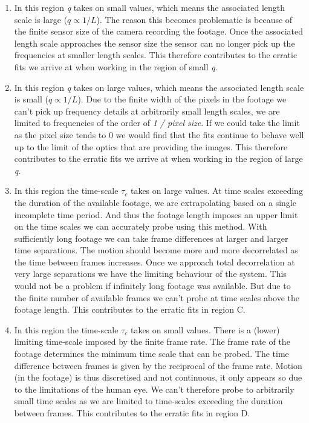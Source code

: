 \documentclass[10pt]{article}
\begin{document}
\begin{enumerate}[label=(\Alph*)]
\item In this region \textit{q} takes on small values, which means the associated length scale is large ($q \propto 1 / L$). The reason this becomes problematic is because of the finite sensor size of the camera recording the footage. Once the associated length scale approaches the sensor size the sensor can no longer pick up the frequencies at smaller length scales. This therefore contributes to the erratic fits we arrive at when working in the region of small \textit{q}.
     
\item In this region \textit{q} takes on large values, which means the associated length scale is small ($q \propto 1 / L$). Due to the finite width of the pixels in the footage we can't pick up frequency details at arbitrarily small length scales, we are limited to frequencies of the order of \textit{1 / pixel size}. If we could take the limit as the pixel size tends to 0 we would find that the fits continue to behave well up to the limit of the optics that are providing the images. This therefore contributes to the erratic fits we arrive at when working in the region of large \textit{q}.

\item In this region the time-scale $\tau_c$ takes on large values. At time scales exceeding the duration of the available footage, we are extrapolating based on a single incomplete time period. And thus the footage length imposes an upper limit on the time scales we can accurately probe using this method. With sufficiently long footage we can take frame differences at larger and larger time separations. The motion should become more and more decorrelated as the time between frames increases. Once we approach total decorrelation at very large separations we have the limiting behaviour of the system. This would not be a problem if infinitely long footage was available. But due to the finite number of available frames we can't probe at time scales above the footage length. This contributes to the erratic fits in region C.

\item In this region the time-scale $\tau_c$ takes on small values. There is a (lower) limiting time-scale imposed by the finite frame rate. The frame rate of the footage determines the minimum time scale that can be probed. The time difference between frames is given by the reciprocal of the frame rate. Motion (in the footage) is thus discretised and not continuous, it only appears so due to the limitations of the human eye. We can't therefore probe to arbitrarily small time scales as we are limited to time-scales exceeding the duration between frames. This contributes to the erratic fits in region D.


\end{enumerate}
\end{document}

